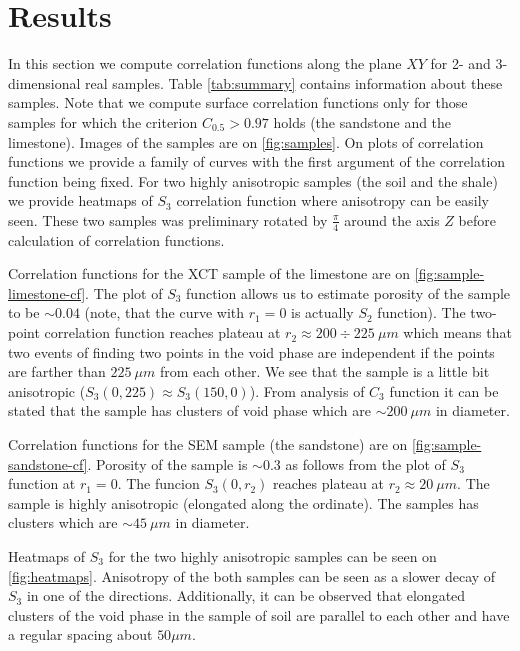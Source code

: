 \documentclass[1p]{elsarticle}
\begin{document}
\section{Results}
In this section we compute correlation functions along the plane $XY$ for 2- and
3-dimensional real samples. Table \ref{tab:summary} contains information about
these samples. Note that we compute surface correlation functions only for those
samples for which the criterion $C_{0.5} > 0.97$ holds (the sandstone and the
limestone). Images of the samples are on \cref{fig:samples}. On plots of
correlation functions we provide a family of curves with the first argument of
the correlation function being fixed. For two highly anisotropic samples (the
soil and the shale) we provide heatmaps of $S_3$ correlation function where
anisotropy can be easily seen. These two samples was preliminary rotated by
$\frac{\pi}{4}$ around the axis $Z$ before calculation of correlation functions.

Correlation functions for the XCT sample of the limestone are on
\cref{fig:sample-limestone-cf}. The plot of $S_3$ function allows us to estimate
porosity of the sample to be $\sim 0.04$ (note, that the curve with $r_1 = 0$ is
actually $S_2$ function). The two-point correlation function reaches plateau at
$r_2 \approx 200\div 225\ \mu m$ which means that two events of finding two
points in the void phase are independent if the points are farther than
$225\ \mu m$ from each other. We see that the sample is a little bit anisotropic
($S_3(0, 225) \approx S_3(150, 0)$). From analysis of $C_3$ function it can be
stated that the sample has clusters of void phase which are $\sim 200\ \mu m$ in
diameter.

Correlation functions for the SEM sample (the sandstone) are on
\cref{fig:sample-sandstone-cf}. Porosity of the sample is $\sim 0.3$ as follows
from the plot of $S_3$ function at $r_1 = 0$. The funcion $S_3(0, r_2)$ reaches
plateau at $r_2 \approx 20\ \mu m$. The sample is highly anisotropic (elongated
along the ordinate). The samples has clusters which are $\sim 45\ \mu m$ in
diameter.

Heatmaps of $S_3$ for the two highly anisotropic samples can be seen on
\cref{fig:heatmaps}. Anisotropy of the both samples can be seen as a slower
decay of $S_3$ in one of the directions. Additionally, it can be observed that
elongated clusters of the void phase in the sample of soil are parallel to each
other and have a regular spacing about $50 \mu m$.
\end{document}
